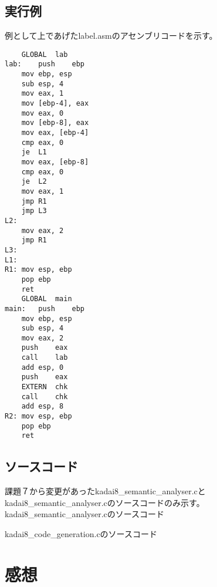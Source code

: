 \documentclass[a4paper,12pt]{jarticle}
\begin{document}
\subsection{実行例}
例として上であげたlabel.asmのアセンブリコードを示す。 
\begin{verbatim}
	GLOBAL	lab
lab:	push	ebp
	mov	ebp, esp
	sub	esp, 4
	mov	eax, 1
	mov	[ebp-4], eax
	mov	eax, 0
	mov	[ebp-8], eax
	mov	eax, [ebp-4]
	cmp	eax, 0
	je	L1
	mov	eax, [ebp-8]
	cmp	eax, 0
	je	L2
	mov	eax, 1
	jmp	R1
	jmp	L3
L2:
	mov	eax, 2
	jmp	R1
L3:
L1:
R1:	mov	esp, ebp
	pop	ebp
	ret
	GLOBAL	main
main:	push	ebp
	mov	ebp, esp
	sub	esp, 4
	mov	eax, 2
	push	eax
	call	lab
	add	esp, 0
	push	eax
	EXTERN	chk
	call	chk
	add	esp, 8
R2:	mov	esp, ebp
	pop	ebp
	ret
\end{verbatim}

\subsection{ソースコード  }
課題７から変更があったkadai8\_semantic\_analyser.cとkadai8\_semantic\_analyser.cのソースコードのみ示す。
kadai8\_semantic\_analyser.cのソースコード

kadai8\_code\_generation.cのソースコード


\section{感想}
\end{document}
